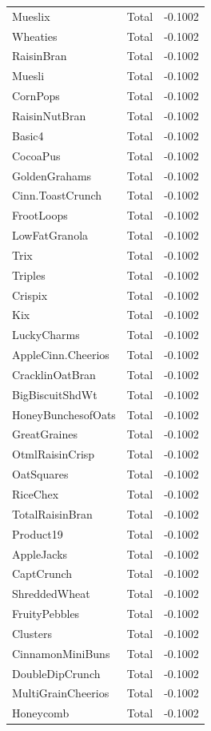 \begin{longtable}{llr}
Mueslix & Total & -0.1002 \\
Wheaties & Total & -0.1002 \\
RaisinBran & Total & -0.1002 \\
Muesli & Total & -0.1002 \\
CornPops & Total & -0.1002 \\
RaisinNutBran & Total & -0.1002 \\
Basic4 & Total & -0.1002 \\
CocoaPus & Total & -0.1002 \\
GoldenGrahams & Total & -0.1002 \\
Cinn.ToastCrunch & Total & -0.1002 \\
FrootLoops & Total & -0.1002 \\
LowFatGranola & Total & -0.1002 \\
Trix & Total & -0.1002 \\
Triples & Total & -0.1002 \\
Crispix & Total & -0.1002 \\
Kix & Total & -0.1002 \\
LuckyCharms & Total & -0.1002 \\
AppleCinn.Cheerios & Total & -0.1002 \\
CracklinOatBran & Total & -0.1002 \\
BigBiscuitShdWt & Total & -0.1002 \\
HoneyBunchesofOats & Total & -0.1002 \\
GreatGraines & Total & -0.1002 \\
OtmlRaisinCrisp & Total & -0.1002 \\
OatSquares & Total & -0.1002 \\
RiceChex & Total & -0.1002 \\
TotalRaisinBran & Total & -0.1002 \\
Product19 & Total & -0.1002 \\
AppleJacks & Total & -0.1002 \\
CaptCrunch & Total & -0.1002 \\
ShreddedWheat & Total & -0.1002 \\
FruityPebbles & Total & -0.1002 \\
Clusters & Total & -0.1002 \\
CinnamonMiniBuns & Total & -0.1002 \\
DoubleDipCrunch & Total & -0.1002 \\
MultiGrainCheerios & Total & -0.1002 \\
Honeycomb & Total & -0.1002 \\

\end{longtable}

